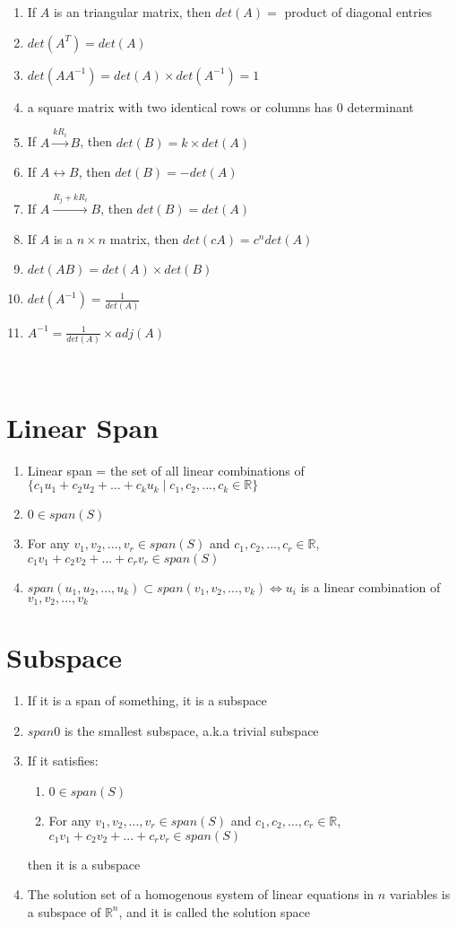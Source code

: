 \documentclass{article}
\begin{document}
\begin{enumerate}
\item If \(A\) is an triangular matrix, then \(det(A) = \) product of diagonal entries
\item \(det(A^T) = det(A)\)
\item \(det(AA^{-1}) = det(A) \times det(A^{-1}) = 1\)
\item a square matrix with two identical rows or columns has \(0\) determinant
\item If \(A \xrightarrow{kR_i} B\), then \(det(B) = k \times det(A)\)
\item If \(A \leftrightarrow B\), then \(det(B) = -det(A)\)
\item If \(A \xrightarrow{R_j + kR_i} B\), then \(det(B) = det(A)\)
\item If \(A\) is a \(n \times n\) matrix, then \(det(cA) = c^n det(A)\)
\item \(det(AB) = det(A) \times det(B)\)
\item \(det(A^{-1}) = \frac{1}{det(A)}\)
\item \(A^{-1} = \frac{1}{det(A)} \times adj(A)\)
\end{enumerate}\

\section*{Linear Span}
\begin{enumerate}
\item Linear span = the set of all linear combinations of \( \{c_1 u_1 + c_2 u_2 + ... + c_k u_k \mid c_1, c_2,..., c_k \in \mathbb{R} \} \)
\item $0 \in span(S)$
\item For any $v_1, v_2, ..., v_r \in span(S)$ and $c_1, c_2, ..., c_r \in \mathbb{R}$, $c_1v_1 + c_2v_2 + ... + c_rv_r \in span(S)$
\item $span(u_1, u_2, ..., u_k) \subset span(v_1, v_2, ..., v_k) \Leftrightarrow u_i$ is a linear combination of $v_1, v_2, ..., v_k$
\end{enumerate}

\section*{Subspace}
\begin{enumerate}
\item If it is a span of something, it is a subspace
\item $span{0}$ is the smallest subspace, a.k.a trivial subspace
\item If it satisfies:
\begin{enumerate}
    \item $0 \in span(S)$
    \item For any $v_1, v_2, ..., v_r \in span(S)$ and $c_1, c_2, ..., c_r \in \mathbb{R}$, $c_1v_1 + c_2v_2 + ... + c_rv_r \in span(S)$
\end{enumerate} then it is a subspace
\item The solution set of a homogenous system of linear equations in $n$ variables is a subspace of $\mathbb{R}^n$, and it is called the solution space
\end{enumerate}
\end{document}
